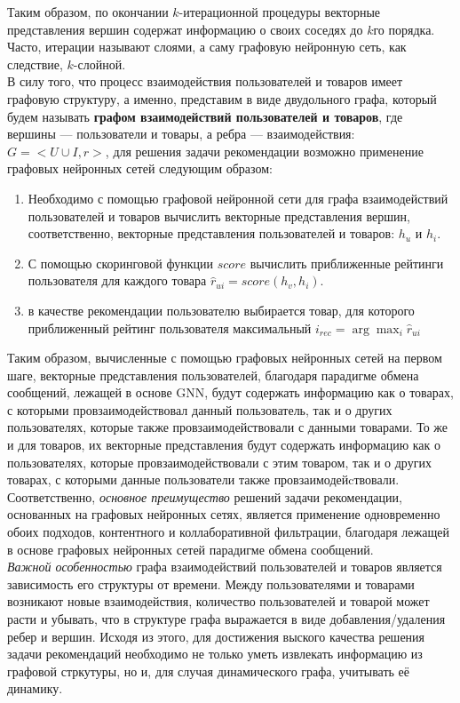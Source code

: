 \documentclass{mipt-thesis-ms}
\begin{document}
Таким образом, по окончании $k$-итерационной процедуры векторные представления вершин содержат информацию о своих соседях до $k$го порядка. Часто, итерации называют слоями, а саму графовую нейронную сеть, как следствие, $k$-слойной.
\\

В силу того, что процесс взаимодействия пользователей и товаров имеет графовую структуру, а именно, представим в виде двудольного графа, который будем называть {\bf графом взаимодействий пользователей и товаров}, где вершины --- пользователи и товары, а ребра --- взаимодействия: $G = <U \cup I, r>$, для решения задачи рекомендации возможно применение графовых нейронных сетей следующим образом:
\begin{enumerate}
\item Необходимо с помощью графовой нейронной сети для графа взаимодействий пользователей и товаров вычислить векторные представления вершин, соответственно, векторные представления пользователей и товаров: $h_u$ и $h_i$.
\item С помощью скоринговой функции $score$ вычислить приближенные рейтинги пользователя для каждого товара $\hat r_{ui} = score(h_v, h_i)$.
\item в качестве рекомендации пользователю выбирается товар, для которого приближенный рейтинг пользователя максимальный $i_{rec} = \arg \max_i \hat r_{ui}$
\end{enumerate}

Таким образом, вычисленные с помощью графовых нейронных сетей на первом шаге, векторные представления пользователей, благодаря парадигме обмена сообщений, лежащей в основе GNN, будут содержать информацию как о товарах, с которыми провзаимодействовал данный пользователь, так и о других пользователях, которые также провзаимодействовали с данными товарами. То же и для товаров, их векторные представления будут содержать информацию как о пользователях, которые провзаимодействовали с этим товаром, так и о других товарах, с которыми данные пользователи также провзаимодейcтвовали.\\

Соответственно, {\it основное преимущество} решений задачи рекомендации, основанных на графовых нейронных сетях, является применение одновременно обоих подходов, контентного и коллаборативной фильтрации, благодаря лежащей в основе графовых нейронных сетей парадигме обмена сообщений.\\

{\it Важной особенностью} графа взаимодействий пользователей и товаров является зависимость его структуры от времени. Между пользователями и товарами возникают новые взаимодействия, количество пользователей и товарой может расти и убывать, что в структуре графа выражается в виде добавления/удаления ребер и вершин. Исходя из этого, для достижения выского качества решения задачи рекомендаций необходимо не только уметь извлекать информацию из графовой стркутуры, но и, для случая динамического графа, учитывать её динамику.
\end{document}
